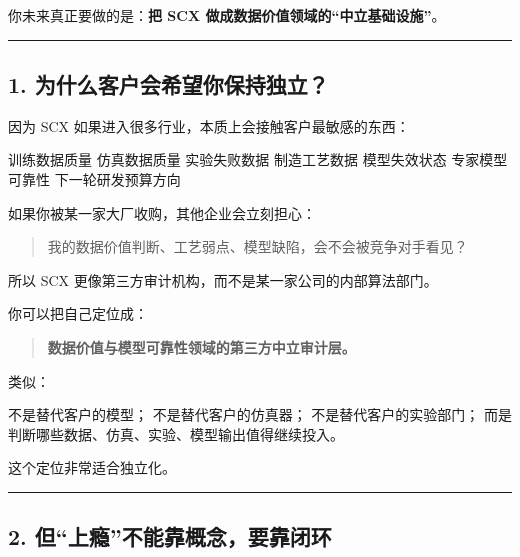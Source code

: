 \documentclass[
  12pt,
]{ctexart}
\newenvironment{Shaded}{}{}
\newcommand{\NormalTok}[1]{#1}
\begin{document}
你未来真正要做的是：\textbf{把 SCX 做成数据价值领域的``中立基础设施''}。

\begin{center}\rule{0.5\linewidth}{0.5pt}\end{center}

\subsection{1.
为什么客户会希望你保持独立？}\label{ux4e3aux4ec0ux4e48ux5ba2ux6237ux4f1aux5e0cux671bux4f60ux4fddux6301ux72ecux7acb}

因为 SCX 如果进入很多行业，本质上会接触客户最敏感的东西：

\begin{Shaded}
\begin{Highlighting}[]
\NormalTok{训练数据质量}
\NormalTok{仿真数据质量}
\NormalTok{实验失败数据}
\NormalTok{制造工艺数据}
\NormalTok{模型失效状态}
\NormalTok{专家模型可靠性}
\NormalTok{下一轮研发预算方向}
\end{Highlighting}
\end{Shaded}

如果你被某一家大厂收购，其他企业会立刻担心：

\begin{quote}
我的数据价值判断、工艺弱点、模型缺陷，会不会被竞争对手看见？
\end{quote}

所以 SCX 更像第三方审计机构，而不是某一家公司的内部算法部门。

你可以把自己定位成：

\begin{quote}
\textbf{数据价值与模型可靠性领域的第三方中立审计层。}
\end{quote}

类似：

\begin{Shaded}
\begin{Highlighting}[]
\NormalTok{不是替代客户的模型；}
\NormalTok{不是替代客户的仿真器；}
\NormalTok{不是替代客户的实验部门；}
\NormalTok{而是判断哪些数据、仿真、实验、模型输出值得继续投入。}
\end{Highlighting}
\end{Shaded}

这个定位非常适合独立化。

\begin{center}\rule{0.5\linewidth}{0.5pt}\end{center}

\subsection{2.
但``上瘾''不能靠概念，要靠闭环}\label{ux4f46ux4e0aux763eux4e0dux80fdux9760ux6982ux5ff5ux8981ux9760ux95edux73af}
\end{document}
